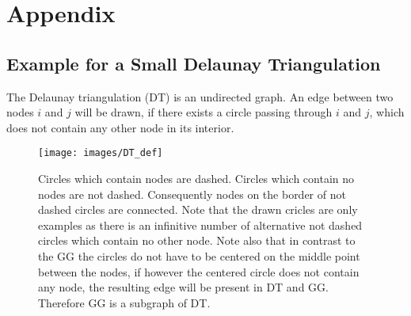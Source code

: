 \section{Appendix}
\subsection{Example for a Small Delaunay Triangulation}
\label{appendix:DT_def}
    The Delaunay triangulation (DT) is an undirected graph. An edge
    between two nodes \(i\) and \(j\) will be drawn, if there exists
    a circle passing through \(i\) and \(j\), which does not contain
    any other node in its interior.
    \begin{figure}[htbp]
    \centering
        \texttt{[image: images/DT\_def]}
        \caption[Example for a Small Delaunay Triangulation]
        {
            Circles which contain nodes are dashed.
            Circles which contain no nodes are not dashed.
            Consequently nodes on the border of not dashed circles are
            connected. Note that the drawn cricles are only examples
            as there is an infinitive number of alternative not
            dashed circles which contain no other node.
            Note also that in contrast to the GG the circles do not
            have to be centered on the middle point between the nodes, if
            however the centered circle does not contain any node, the
            resulting edge will be present in DT and GG. Therefore GG is
            a subgraph of DT.
        }
        \label{fig:def:DT}
    \end{figure}

